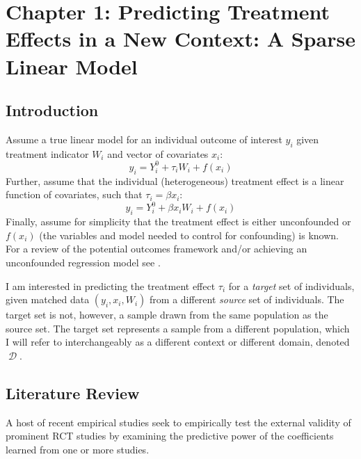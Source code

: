 \documentclass[a4paper,12pt]{article}
\DeclareMathOperator*{\D}{\mathcal{D}}
\begin{document}
\section{ Chapter 1: Predicting Treatment Effects in a New Context: A Sparse Linear Model }

\subsection{ Introduction }

Assume a true linear model for an individual outcome of interest $y_i$ given treatment indicator $W_i$ and vector of covariates $x_i$:
%
$$
y_i = Y^0_i + \tau_i W_i + f(x_i)
$$
%
Further, assume that the individual (heterogeneous) treatment effect is a linear function of covariates, such that $\tau_i = \beta x_i$:
%
$$
y_i = Y^0_i + \beta x_iW_i + f(x_i)
$$
%
Finally, assume for simplicity that the treatment effect is either unconfounded or $f(x_i)$ (the variables and model needed to control for confounding) is known. For a review of the potential outcomes framework and/or achieving an unconfounded regression model see \cite{Holland1986, imbens2015causal}.

I am interested in predicting the treatment effect $\tau_i$ for a \textit{target} set of individuals, given matched data $(y_i, x_i, W_i)$ from a different \textit{source} set of individuals. The target set is not, however, a sample drawn from the same population as the source set. The target set represents a sample from a different population, which I will refer to interchangeably as a different context or different domain, denoted $\D$.


\subsection{ Literature Review }

A host of recent empirical studies seek to empirically test the external validity of prominent RCT studies by examining the predictive power of the coefficients learned from one or more studies. 
\end{document}
